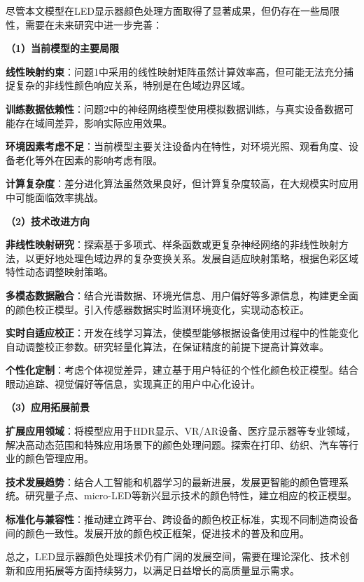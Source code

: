 尽管本文模型在LED显示器颜色处理方面取得了显著成果，但仍存在一些局限性，需要在未来研究中进一步完善：

\noindent\textbf{（1）当前模型的主要局限}

\textbf{线性映射约束}：问题1中采用的线性映射矩阵虽然计算效率高，但可能无法充分捕捉复杂的非线性颜色响应关系，特别是在色域边界区域。

\textbf{训练数据依赖性}：问题2中的神经网络模型使用模拟数据训练，与真实设备数据可能存在域间差异，影响实际应用效果。

\textbf{环境因素考虑不足}：当前模型主要关注设备内在特性，对环境光照、观看角度、设备老化等外在因素的影响考虑有限。

\textbf{计算复杂度}：差分进化算法虽然效果良好，但计算复杂度较高，在大规模实时应用中可能面临效率挑战。

\noindent\textbf{（2）技术改进方向}

\textbf{非线性映射研究}：探索基于多项式、样条函数或更复杂神经网络的非线性映射方法，以更好地处理色域边界的复杂变换关系。发展自适应映射策略，根据色彩区域特性动态调整映射策略。

\textbf{多模态数据融合}：结合光谱数据、环境光信息、用户偏好等多源信息，构建更全面的颜色校正模型。引入传感器数据实时监测环境变化，实现动态校正。

\textbf{实时自适应校正}：开发在线学习算法，使模型能够根据设备使用过程中的性能变化自动调整校正参数。研究轻量化算法，在保证精度的前提下提高计算效率。

\textbf{个性化定制}：考虑个体视觉差异，建立基于用户特征的个性化颜色校正模型。结合眼动追踪、视觉偏好等信息，实现真正的用户中心化设计。

\noindent\textbf{（3）应用拓展前景}

\textbf{扩展应用领域}：将模型应用于HDR显示、VR/AR设备、医疗显示器等专业领域，解决高动态范围和特殊应用场景下的颜色处理问题。探索在打印、纺织、汽车等行业的颜色管理应用。

\textbf{技术发展趋势}：结合人工智能和机器学习的最新进展，发展更智能的颜色管理系统。研究量子点、micro-LED等新兴显示技术的颜色特性，建立相应的校正模型。

\textbf{标准化与兼容性}：推动建立跨平台、跨设备的颜色校正标准，实现不同制造商设备间的颜色一致性。发展开放的颜色校正框架，促进技术的普及和应用。

总之，LED显示器颜色处理技术仍有广阔的发展空间，需要在理论深化、技术创新和应用拓展等方面持续努力，以满足日益增长的高质量显示需求。
